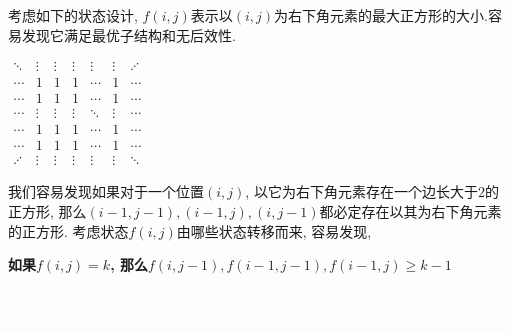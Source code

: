 考虑如下的状态设计, $f(i,j)$表示以$(i,j)$为右下角元素的最大正方形的大小.容易发现它满足最优子结构和无后效性.
\begin{center}
	\begin{math}
	\begin{matrix}
	\ddots& \vdots& \vdots& \vdots& \vdots& \vdots& \adots& \\ 
	\cdots& 1     & 1     & 1     & \cdots& 1     & \cdots& \\
	\cdots& 1     & 1     & 1     & \cdots& 1     & \cdots& \\
	\cdots& \vdots& \vdots& \vdots& \ddots& \vdots& \cdots& \\
	\cdots& 1     & 1     & 1     & \cdots& 1     & \cdots& \\
	\cdots& 1     & 1     & 1     &　\cdots& 1     & \cdots& \\ 
	\adots& \vdots& \vdots& \vdots& \vdots& \vdots& \ddots& 
	\end{matrix}
	\end{math}
\end{center}
\par 我们容易发现如果对于一个位置$(i,j)$, 以它为右下角元素存在一个边长大于$2$的正方形, 那么$(i-1,j-1),(i-1,j),(i,j-1)$都必定存在以其为右下角元素的正方形.
考虑状态$f(i,j)$由哪些状态转移而来, 容易发现, \begin{center}\textbf{如果$f(i,j)=k$, 那么$f(i,j-1),f(i-1,j-1),f(i-1,j)\geq k-1$}\end{center}


\note

\textcolor{white}{希望大家不要放弃，OIer这个群体很是特殊，并且饱受排挤，大家一定坚持下去，不管外界怎么看待我们，一定要记住自己的目标。不忘初心，方得始终。}
\newpage
